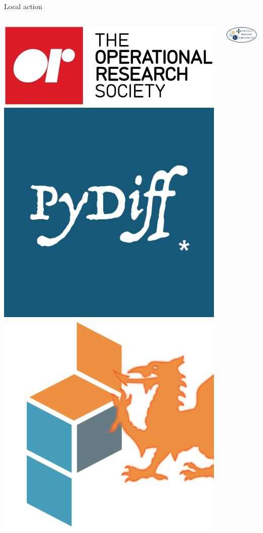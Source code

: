 \documentclass{beamer}
\begin{document}
\begin{frame}{Local action}
    \begin{columns}[T]
        \begin{column}{.5\textwidth}
            \centering
            \includegraphics[width=\linewidth]{theorsociety.jpg}\\
            \vspace{30pt}
            \includegraphics[width=.4\linewidth]{pydiff.png}%
            \includegraphics[width=.4\linewidth]{pydata.jpg}
        \end{column}
        \begin{column}{.5\textwidth}
            \centering
            \includegraphics[width=.8\linewidth]{wmc.png}\\

\end{column}
\end{columns}
\end{frame}
\end{document}
